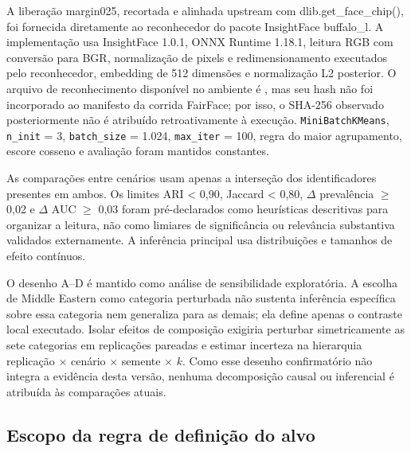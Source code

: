 
A liberação margin025, recortada e alinhada upstream com dlib.get\_face\_chip(), foi fornecida diretamente ao reconhecedor do pacote InsightFace buffalo\_l. A implementação usa InsightFace 1.0.1, ONNX Runtime 1.18.1, leitura RGB com conversão para BGR, normalização de pixels e redimensionamento executados pelo reconhecedor, embedding de 512 dimensões e normalização L2 posterior. O arquivo de reconhecimento disponível no ambiente é , mas seu hash não foi incorporado ao manifesto da corrida FairFace; por isso, o SHA-256 observado posteriormente não é atribuído retroativamente à execução. \texttt{MiniBatchKMeans}, \texttt{n\_init} = 3, \texttt{batch\_size} = 1.024, \texttt{max\_iter} = 100, regra do maior agrupamento, escore cosseno e avaliação foram mantidos constantes.

As comparações entre cenários usam apenas a interseção dos identificadores presentes em ambos. Os limites ARI \textless{} 0,90, Jaccard \textless{} 0,80, \textbar $\Delta$ prevalência\textbar{} $\geq$ 0,02 e \textbar $\Delta$ AUC\textbar{} $\geq$ 0,03 foram pré-declarados como heurísticas descritivas para organizar a leitura, não como limiares de significância ou relevância substantiva validados externamente. A inferência principal usa distribuições e tamanhos de efeito contínuos.

O desenho A--D é mantido como análise de sensibilidade exploratória. A escolha de Middle Eastern como categoria perturbada não sustenta inferência específica sobre essa categoria nem generaliza para as demais; ela define apenas o contraste local executado. Isolar efeitos de composição exigiria perturbar simetricamente as sete categorias em replicações pareadas e estimar incerteza na hierarquia replicação $\times$ cenário $\times$ semente $\times$ $k$. Como esse desenho confirmatório não integra a evidência desta versão, nenhuma decomposição causal ou inferencial é atribuída às comparações atuais.

\subsection{Escopo da regra de definição do alvo}

